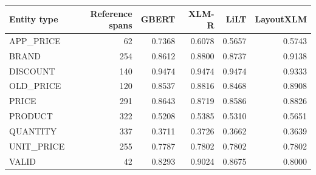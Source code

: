 \begin{tabular}{@{}lrrrrr@{}}
\toprule
Entity type & Reference spans & GBERT & XLM-R & LiLT & LayoutXLM \\
\midrule
APP\_PRICE & 62 & 0.7368 & 0.6078 & 0.5657 & 0.5743 \\
BRAND & 254 & 0.8612 & 0.8800 & 0.8737 & 0.9138 \\
DISCOUNT & 140 & 0.9474 & 0.9474 & 0.9474 & 0.9333 \\
OLD\_PRICE & 120 & 0.8537 & 0.8816 & 0.8468 & 0.8908 \\
PRICE & 291 & 0.8643 & 0.8719 & 0.8586 & 0.8826 \\
PRODUCT & 322 & 0.5208 & 0.5385 & 0.5310 & 0.5651 \\
QUANTITY & 337 & 0.3711 & 0.3726 & 0.3662 & 0.3639 \\
UNIT\_PRICE & 255 & 0.7787 & 0.7802 & 0.7802 & 0.7802 \\
VALID & 42 & 0.8293 & 0.9024 & 0.8675 & 0.8000 \\
\bottomrule
\end{tabular}
